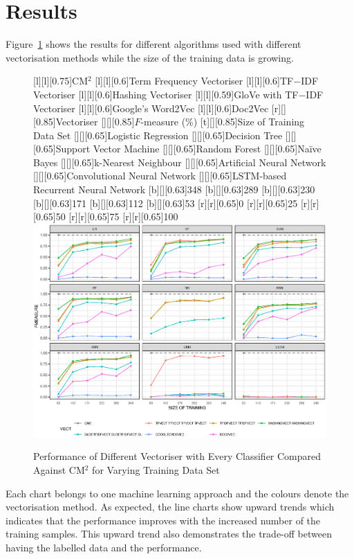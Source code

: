 \section{Results}\label{result}
Figure~\ref{resultset} shows the results for different algorithms used with different vectorisation methods while the size of the training data is growing. 
\begin{figure}[t]
{}[l][l][0.75]{CM$^2$}
[l][l][0.6]{Term Frequency Vectoriser}
[l][l][0.6]{TF$-$IDF Vectoriser}
[l][l][0.6]{Hashing Vectoriser}
[l][l][0.59]{GloVe with TF$-$IDF Vectoriser}
[l][l][0.6]{Google's Word2Vec}
[l][l][0.6]{Doc2Vec}
[r][][0.85]{Vectoriser}
[][][0.85]{$F$-measure (\%)}
[t][][0.85]{Size of Training Data Set}
[][][0.65]{Logistic Regression}
[][][0.65]{Decision Tree}
[][][0.65]{Support Vector Machine}
[][][0.65]{Random Forest}
[][][0.65]{Na\"ive Bayes}
[][][0.65]{k-Nearest Neighbour}
[][][0.65]{Artificial Neural Network}
[][][0.65]{Convolutional Neural Network}
[][][0.65]{LSTM-based Recurrent Neural Network}
[b][][0.63]{348}
[b][][0.63]{289}
[b][][0.63]{230}
[b][][0.63]{171}
[b][][0.63]{112}
[b][][0.63]{53}
[r][r][0.65]{0}
[r][r][0.65]{25}
[r][r][0.65]{50}
[r][r][0.65]{75}
[r][r][0.65]{100}
\includegraphics[width=\textwidth]{results}
\caption{Performance of Different Vectoriser with Every Classifier Compared Against CM$^2$ for Varying Training Data Set}\label{resultset}
\end{figure}
Each chart belongs to one machine learning approach and the colours denote the vectorisation method. As expected, the line charts show upward trends which indicates that the performance improves with the increased number of the training samples. This upward trend also demonstrates the trade-off between having the labelled data and the performance.

